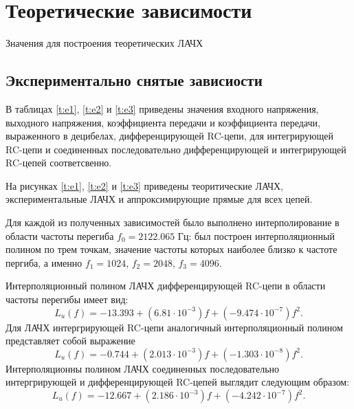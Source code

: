 \section{Теоретические зависимости}

\begin{center}
\begin{table}[h]
\caption{Значения для построения теоретических ЛАЧХ}
\end{table}
\end{center}
    
\subsection{Экспериментально снятые зависиости}
В таблицах \ref{t:e1}, \ref{t:e2} и \ref{t:e3} приведены значения входного напряжения, выходного напряжения, коэффициента передачи и коэффициента передачи, выраженного в децибелах, дифференцирующей RC-цепи, для интегрирующей RC-цепи и соединенных последовательно дифференцирующей и интегрирующей RC-цепей соответсвенно. 

На рисунках \ref{t:e1}, \ref{t:e2} и \ref{t:e3} приведены теоритические ЛАЧХ, экспериментальные ЛАЧХ и аппроксимирующие прямые для всех цепей.

Для каждой из полученных зависимостей было выполнено интерполирование в области частоты перегиба $f_0 = 2122.065$ Гц: был построен интерполяционный полином по трем точкам, значение частоты которых наиболее близко к частоте пергиба, а именно $f_1 = 1024$, $f_2 = 2048$, $f_3 = 4096$.  

Интерполяционный полином ЛАЧХ дифференцирующей RC-цепи в области частоты перегибы имеет вид:
\begin{equation}
L_u(f) = -13.393 + (6.81 \cdot 10^{-3})f + (-9.474 \cdot 10^{-7})f^2. 
\end{equation}
Для ЛАЧХ интергрирующей RC-цепи аналогичный интерполяционный полином представляет собой выражение
\begin{equation}
L_u(f) = -0.744 + (2.013 \cdot 10^{-3})f + (-1.303 \cdot 10^{-8})f^2.
\end{equation}
Интерполяционны полином ЛАЧХ соединенных последовательно интергрирующей и дифференцирующей RC-цепей выглядит следующим образом:
\begin{equation}
L_u(f) = -12.667 + (2.186 \cdot 10^{-3})f + (-4.242 \cdot 10^{-7})f^2.
\end{equation}

